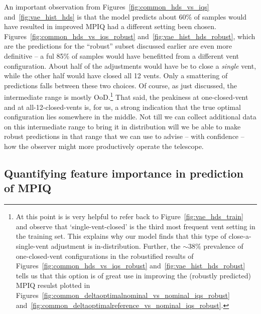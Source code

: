 An important observation from Figures~\ref{fig:common_hds_vs_iqs} and~\ref{fig:vae_hist_hds} is that the model predicts about 60\% of samples would have resulted in improved MPIQ had a different setting been chosen.  Figures~\ref{fig:common_hds_vs_iqs_robust} and~\ref{fig:vae_hist_hds_robust}, which are the predictions for the ``robust'' subset discussed earlier are even more definitive -- a ful 85\% of samples would have benefitted from a different vent configuration.  About half of the adjustments would have be to close a {\it single} vent, while the other half would have closed all 12 vents.  Only a smattering of predictions falls between these two choices.  Of course, as just discussed, the intermediate range is mostly OoD.\footnote{At this point is is very helpful to refer back to Figure~\ref{fig:vae_hds_train} and observe that `single-vent-closed' is the third most frequent vent setting in the training set. This explains why our model finds that this type of close-a-single-vent adjustment is in-distribution.
Further, the $\sim 38\%$ prevalence of one-closed-vent configurations in the robustified results of Figures~\ref{fig:common_hds_vs_iqs_robust} and~\ref{fig:vae_hist_hds_robust} tells us that this option is of great use in improving the (robustly predicted) MPIQ resulst plotted in
Figures~\ref{fig:common_deltaoptimalnominal_vs_nominal_iqs_robust} and~\ref{fig:common_deltaoptimalreference_vs_nominal_iqs_robust}.
} That said, the peakiness at one-closed-vent and at all-12-closed-vents is, for us, a strong indication that the true optimal configuration lies somewhere in the middle.  Not till we can collect additional data on this intermediate range to bring it in distribution will we be able to make robust predictions in that range that we can use to advise -- with confidence -- how the observer might more productively operate the telescope. 

\subsection{Quantifying feature importance in prediction of MPIQ}
\label{sec:resultsRelContribIQ}

